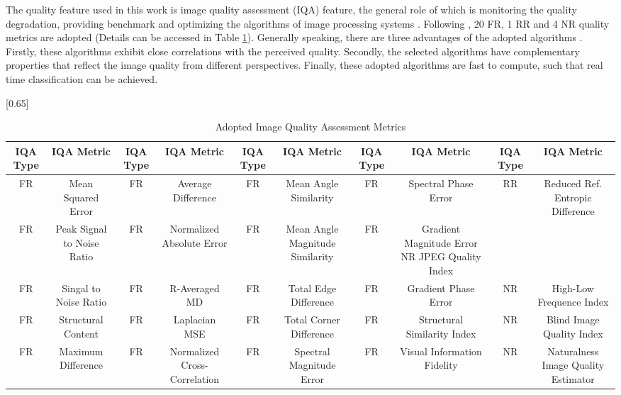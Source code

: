 \documentclass[journal]{IEEEtran}
\begin{document}
The quality feature used in this work is image quality assessment (IQA) feature, the general role of which is monitoring the quality degradation, providing benchmark and optimizing the algorithms of image processing systems \cite{wang2016guided}\cite{wang2012ssim}\cite{lin2011perceptual}\cite{wang2004image}. Following \cite{galbally2014image}, 20 FR, 1 RR and 4 NR quality metrics are adopted (Details can be accessed in Table \ref{tab.b.2.metric}). Generally speaking, there are three advantages of the adopted algorithms \cite{galbally2014image}. Firstly, these algorithms exhibit close correlations with the perceived quality. Secondly, the selected algorithms have complementary properties that reflect the image quality from different perspectives. Finally, these adopted algorithms are fast to compute, such that real time classification can be achieved.
\begin{table}[htbp]
\centering
\caption{Adopted Image Quality Assessment Metrics \cite{galbally2014image}}
\label{tab.b.2.metric}
\scalebox{0.65}[0.65]{
\begin{tabular}{cccccccccc}
\toprule
IQA Type & IQA Metric & IQA Type & IQA Metric & IQA Type & IQA Metric & IQA Type & IQA Metric & IQA Type & IQA Metric \\
\midrule
FR & Mean Squared Error & FR & Average Difference & FR & Mean Angle Similarity & FR & Spectral Phase Error & RR & Reduced Ref. Entropic Difference \\
FR & Peak Signal to Noise Ratio & FR & Normalized Absolute Error & FR & Mean Angle Magnitude Similarity & FR & Gradient Magnitude Error NR JPEG Quality Index \\
FR & Singal to Noise Ratio & FR & R-Averaged MD & FR & Total Edge Difference & FR & Gradient Phase Error & NR & High-Low Frequence Index \\
FR & Structural Content & FR & Laplacian MSE & FR & Total Corner Difference & FR & Structural Similarity Index & NR & Blind Image Quality Index \\
FR & Maximum Difference & FR & Normalized Cross-Correlation & FR & Spectral Magnitude Error & FR & Visual Information Fidelity & NR & Naturalness Image Quality Estimator \\
\bottomrule
\end{tabular}}
\end{table}
\end{document}
